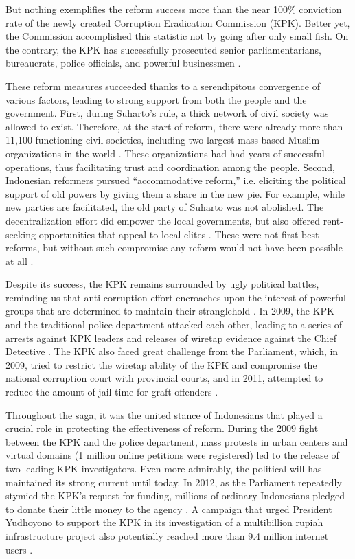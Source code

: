 \documentclass[12pt]{article}
\begin{document}
But nothing exemplifies the reform success more than the near 100\% conviction rate of the newly created Corruption Eradication Commission (KPK). Better yet, the Commission accomplished this statistic not by going after only small fish. On the contrary, the KPK has successfully prosecuted senior parliamentarians, bureaucrats, police officials, and powerful businessmen \citep{Schutte2012}.

These reform measures succeeded thanks to a serendipitous convergence of various factors, leading to strong support from both the people and the government. First, during Suharto's rule, a thick network of civil society was allowed to exist. Therefore, at the start of reform, there were already more than 11,100 functioning civil societies, including two largest mass-based Muslim organizations in the world \citep{Harris2011}. These organizations had had years of successful operations, thus facilitating trust and coordination among the people. Second, Indonesian reformers pursued ``accommodative reform,'' i.e. eliciting the political support of old powers by giving them a share in the new pie. For example, while new parties are facilitated, the old party of Suharto was not abolished. The decentralization effort did empower the local governments, but also offered rent-seeking opportunities that appeal to local elites \citep{Hadiz2004}. These were not first-best reforms, but without such compromise any reform would not have been possible at all \citep{Harris2011}.

Despite its success, the KPK remains surrounded by ugly political battles, reminding us that anti-corruption effort encroaches upon the interest of powerful groups that are determined to maintain their stranglehold \citep{Kimura2011}. In 2009, the KPK and the traditional police department attacked each other, leading to a series of arrests against KPK leaders and releases of wiretap evidence against the Chief Detective \citep{Luebke2012}. The KPK also faced great challenge from the Parliament, which, in 2009, tried to restrict the wiretap ability of the KPK and compromise the national corruption court with provincial courts, and in 2011, attempted to reduce the amount of jail time for graft offenders \citep{TransparencyInternational2011}.

Throughout the saga, it was the united stance of Indonesians that played a crucial role in protecting the effectiveness of reform. During the 2009 fight between the KPK and the police department, mass protests in urban centers and virtual domains (1 million online petitions were registered) led to the release of two leading KPK investigators. Even more admirably, the political will has maintained its strong current until today. In 2012, as the Parliament repeatedly stymied the KPK's request for funding, millions of ordinary Indonesians pledged to donate their little money to the agency \citep{Jaaffar2012}. A campaign that urged President Yudhoyono to support the KPK in its investigation of a multibillion rupiah infrastructure project also potentially reached more than 9.4 million internet users \citep{Mahditama2012}.
\end{document}
